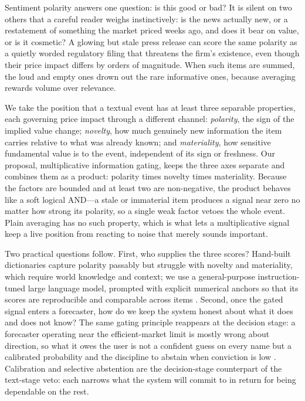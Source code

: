 \documentclass{elektr}
\begin{document}
Sentiment polarity answers one question: is this good or bad? It is silent on two others that a careful reader weighs instinctively: is the news actually new, or a restatement of something the market priced weeks ago, and does it bear on value, or is it cosmetic? A glowing but stale press release can score the same polarity as a quietly worded regulatory filing that threatens the firm's existence, even though their price impact differs by orders of magnitude. When such items are summed, the loud and empty ones drown out the rare informative ones, because averaging rewards volume over relevance.

We take the position that a textual event has at least three separable properties, each governing price impact through a different channel: \emph{polarity}, the sign of the implied value change; \emph{novelty}, how much genuinely new information the item carries relative to what was already known; and \emph{materiality}, how sensitive fundamental value is to the event, independent of its sign or freshness. Our proposal, multiplicative information gating, keeps the three axes separate and combines them as a product: polarity times novelty times materiality. Because the factors are bounded and at least two are non-negative, the product behaves like a soft logical AND---a stale or immaterial item produces a signal near zero no matter how strong its polarity, so a single weak factor vetoes the whole event. Plain averaging has no such property, which is what lets a multiplicative signal keep a live position from reacting to noise that merely sounds important.

Two practical questions follow. First, who supplies the three scores? Hand-built dictionaries capture polarity passably \cite{loughran2011} but struggle with novelty and materiality, which require world knowledge and context; we use a general-purpose instruction-tuned large language model, prompted with explicit numerical anchors so that its scores are reproducible and comparable across items \cite{brown2020,lopezlira2023}. Second, once the gated signal enters a forecaster, how do we keep the system honest about what it does and does not know? The same gating principle reappears at the decision stage: a forecaster operating near the efficient-market limit \cite{fama1970} is mostly wrong about direction, so what it owes the user is not a confident guess on every name but a calibrated probability and the discipline to abstain when conviction is low \cite{chow1970,elyaniv2010,geifman2017}. Calibration and selective abstention are the decision-stage counterpart of the text-stage veto: each narrows what the system will commit to in return for being dependable on the rest.
\end{document}
